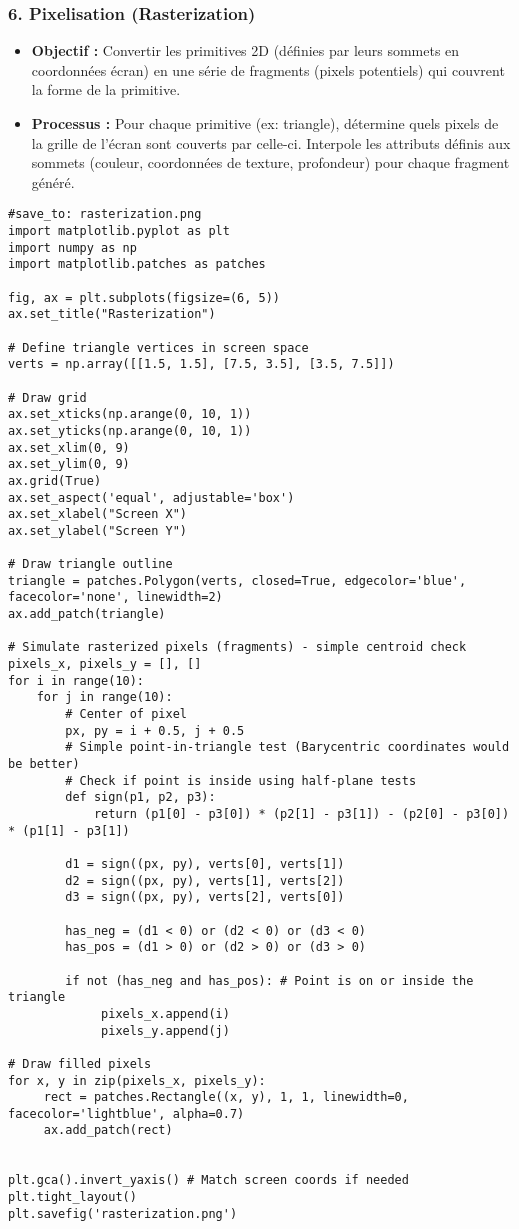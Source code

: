 \documentclass{article}
\begin{document}
\subsubsection{6. Pixelisation (Rasterization)}
\begin{itemize}
    \item \textbf{Objectif :} Convertir les primitives 2D (définies par leurs sommets en coordonnées écran) en une série de fragments (pixels potentiels) qui couvrent la forme de la primitive.
    \item \textbf{Processus :} Pour chaque primitive (ex: triangle), détermine quels pixels de la grille de l'écran sont couverts par celle-ci. Interpole les attributs définis aux sommets (couleur, coordonnées de texture, profondeur) pour chaque fragment généré.
\end{itemize}

\begin{verbatim}
#save_to: rasterization.png
import matplotlib.pyplot as plt
import numpy as np
import matplotlib.patches as patches

fig, ax = plt.subplots(figsize=(6, 5))
ax.set_title("Rasterization")

# Define triangle vertices in screen space
verts = np.array([[1.5, 1.5], [7.5, 3.5], [3.5, 7.5]])

# Draw grid
ax.set_xticks(np.arange(0, 10, 1))
ax.set_yticks(np.arange(0, 10, 1))
ax.set_xlim(0, 9)
ax.set_ylim(0, 9)
ax.grid(True)
ax.set_aspect('equal', adjustable='box')
ax.set_xlabel("Screen X")
ax.set_ylabel("Screen Y")

# Draw triangle outline
triangle = patches.Polygon(verts, closed=True, edgecolor='blue', facecolor='none', linewidth=2)
ax.add_patch(triangle)

# Simulate rasterized pixels (fragments) - simple centroid check
pixels_x, pixels_y = [], []
for i in range(10):
    for j in range(10):
        # Center of pixel
        px, py = i + 0.5, j + 0.5
        # Simple point-in-triangle test (Barycentric coordinates would be better)
        # Check if point is inside using half-plane tests
        def sign(p1, p2, p3):
            return (p1[0] - p3[0]) * (p2[1] - p3[1]) - (p2[0] - p3[0]) * (p1[1] - p3[1])

        d1 = sign((px, py), verts[0], verts[1])
        d2 = sign((px, py), verts[1], verts[2])
        d3 = sign((px, py), verts[2], verts[0])

        has_neg = (d1 < 0) or (d2 < 0) or (d3 < 0)
        has_pos = (d1 > 0) or (d2 > 0) or (d3 > 0)

        if not (has_neg and has_pos): # Point is on or inside the triangle
             pixels_x.append(i)
             pixels_y.append(j)

# Draw filled pixels
for x, y in zip(pixels_x, pixels_y):
     rect = patches.Rectangle((x, y), 1, 1, linewidth=0, facecolor='lightblue', alpha=0.7)
     ax.add_patch(rect)


plt.gca().invert_yaxis() # Match screen coords if needed
plt.tight_layout()
plt.savefig('rasterization.png')
\end{verbatim}
\end{document}
